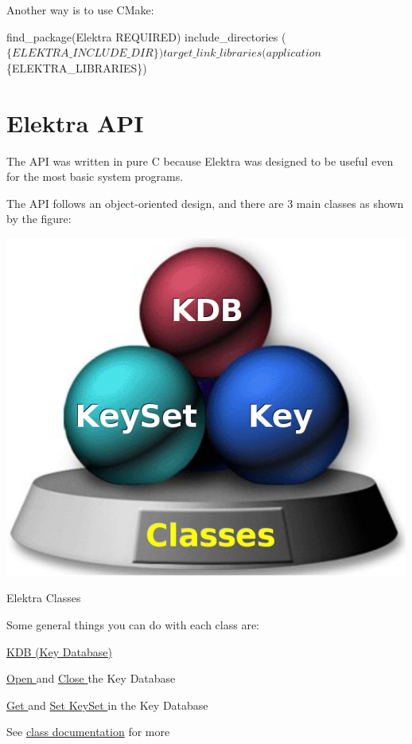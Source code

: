 Another way is to use C\+Make\+: 
\begin{DoxyCode}
find\_package(Elektra REQUIRED)
include\_directories ($\{ELEKTRA\_INCLUDE\_DIR\})
target\_link\_libraries (application $\{ELEKTRA\_LIBRARIES\})
\end{DoxyCode}
\hypertarget{index_classes}{}\section{Elektra A\+P\+I}\label{index_classes}
The A\+P\+I was written in pure C because Elektra was designed to be useful even for the most basic system programs.

The A\+P\+I follows an object-\/oriented design, and there are 3 main classes as shown by the figure\+:


\begin{DoxyImage}
\includegraphics{classes.png}
\caption{Elektra Classes}
\end{DoxyImage}
 Some general things you can do with each class are\+:

\hyperlink{group__kdb}{K\+D\+B (Key Database) }
\begin{DoxyItemize}
\item \hyperlink{group__kdb_ga6808defe5870f328dd17910aacbdc6ca}{Open } and \hyperlink{group__kdb_gadb54dc9fda17ee07deb9444df745c96f}{Close } the Key Database
\item \hyperlink{group__kdb_ga28e385fd9cb7ccfe0b2f1ed2f62453a1}{Get } and \hyperlink{group__kdb_ga11436b058408f83d303ca5e996832bcf}{Set } \hyperlink{group__keyset}{Key\+Set } in the Key Database
\item See \hyperlink{group__kdb}{class documentation} for more
\end{DoxyItemize}

